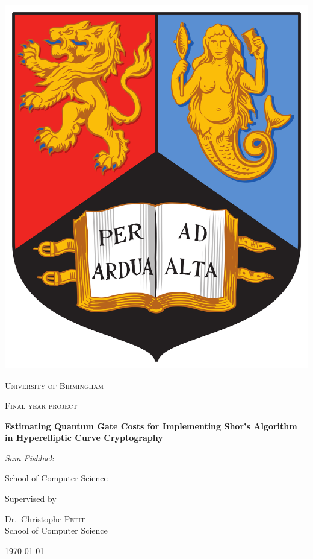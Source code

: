 \begin{titlepage}


\thispagestyle{empty}
\setlength\headheight{0pt} 
\begin{center}

\begin{center}
\includegraphics[width=0.25\linewidth]{img/bham.png}            
\end{center}	

        \vspace{0.25cm}
        {\scshape\LARGE University of Birmingham \par}
        \vspace{0.25cm}
        {\scshape\Large Final year project\par}
        \vspace{0.5cm}

        {\Large\bfseries Estimating Quantum Gate Costs for Implementing Shor's Algorithm \\ in Hyperelliptic Curve Cryptography\par}
        
        \vspace{0.5cm}
        {\Large\itshape Sam Fishlock\par}
        School of Computer Science
        \vspace{0.25cm}

\vspace{1cm}
Supervised by\par
Dr.~Christophe \textsc{Petit} \\
School of Computer Science\par
\vspace{1.5cm}
\large
\today

\end{center}

\clearpage
\restoregeometry
\end{titlepage}
